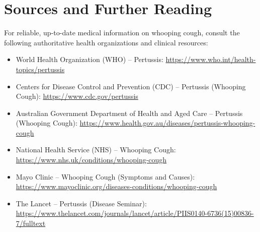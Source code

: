 \section*{Sources and Further Reading}
For reliable, up-to-date medical information on whooping cough, consult the following authoritative health organizations and clinical resources:
\begin{itemize}
    \item World Health Organization (WHO) -- Pertussis: \url{https://www.who.int/health-topics/pertussis}
    \item Centers for Disease Control and Prevention (CDC) -- Pertussis (Whooping Cough): \url{https://www.cdc.gov/pertussis}
    \item Australian Government Department of Health and Aged Care -- Pertussis (Whooping Cough): \url{https://www.health.gov.au/diseases/pertussis-whooping-cough}
    \item National Health Service (NHS) -- Whooping Cough: \url{https://www.nhs.uk/conditions/whooping-cough}
    \item Mayo Clinic -- Whooping Cough (Symptoms and Causes): \url{https://www.mayoclinic.org/diseases-conditions/whooping-cough}
    \item The Lancet -- Pertussis (Disease Seminar): \url{https://www.thelancet.com/journals/lancet/article/PIIS0140-6736(15)00836-7/fulltext}
\end{itemize}